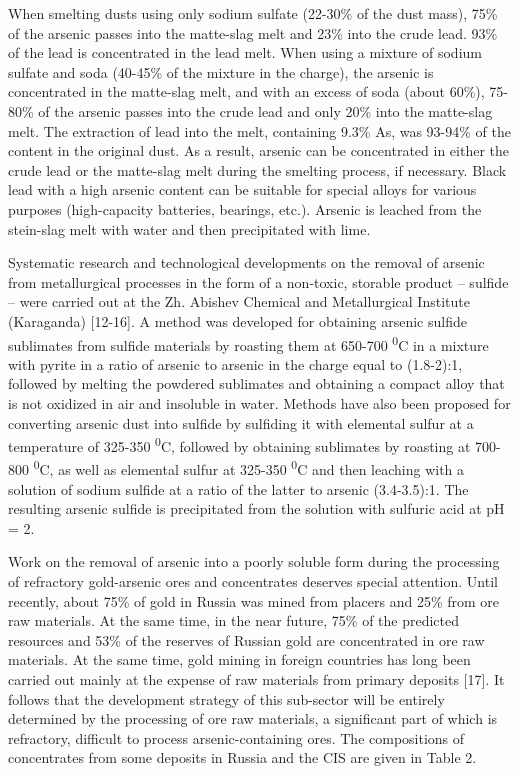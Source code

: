 When smelting dusts using only sodium sulfate (22-30\% of the dust
mass), 75\% of the arsenic passes into the matte-slag melt and 23\% into
the crude lead. 93\% of the lead is concentrated in the lead melt. When
using a mixture of sodium sulfate and soda (40-45\% of the mixture in
the charge), the arsenic is concentrated in the matte-slag melt, and
with an excess of soda (about 60\%), 75-80\% of the arsenic passes into
the crude lead and only 20\% into the matte-slag melt. The extraction of
lead into the melt, containing 9.3\% As, was 93-94\% of the content in
the original dust. As a result, arsenic can be concentrated in either
the crude lead or the matte-slag melt during the smelting process, if
necessary. Black lead with a high arsenic content can be suitable for
special alloys for various purposes (high-capacity batteries, bearings,
etc.). Arsenic is leached from the stein-slag melt with water and then
precipitated with lime.

Systematic research and technological developments on the removal of
arsenic from metallurgical processes in the form of a non-toxic,
storable product -- sulfide -- were carried out at the Zh. Abishev
Chemical and Metallurgical Institute (Karaganda) {[}12-16{]}. A method
was developed for obtaining arsenic sulfide sublimates from sulfide
materials by roasting them at 650-700 \textsuperscript{0}C in a mixture
with pyrite in a ratio of arsenic to arsenic in the charge equal to
(1.8-2):1, followed by melting the powdered sublimates and obtaining a
compact alloy that is not oxidized in air and insoluble in water.
Methods have also been proposed for converting arsenic dust into sulfide
by sulfiding it with elemental sulfur at a temperature of 325-350
\textsuperscript{0}C, followed by obtaining sublimates by roasting at
700-800 \textsuperscript{0}C, as well as elemental sulfur at 325-350
\textsuperscript{0}C and then leaching with a solution of sodium sulfide
at a ratio of the latter to arsenic (3.4-3.5):1. The resulting arsenic
sulfide is precipitated from the solution with sulfuric acid at pH = 2.

Work on the removal of arsenic into a poorly soluble form during the
processing of refractory gold-arsenic ores and concentrates deserves
special attention. Until recently, about 75\% of gold in Russia was
mined from placers and 25\% from ore raw materials. At the same time, in
the near future, 75\% of the predicted resources and 53\% of the
reserves of Russian gold are concentrated in ore raw materials. At the
same time, gold mining in foreign countries has long been carried out
mainly at the expense of raw materials from primary deposits {[}17{]}.
It follows that the development strategy of this sub-sector will be
entirely determined by the processing of ore raw materials, a
significant part of which is refractory, difficult to process
arsenic-containing ores. The compositions of concentrates from some
deposits in Russia and the CIS are given in Table 2.

